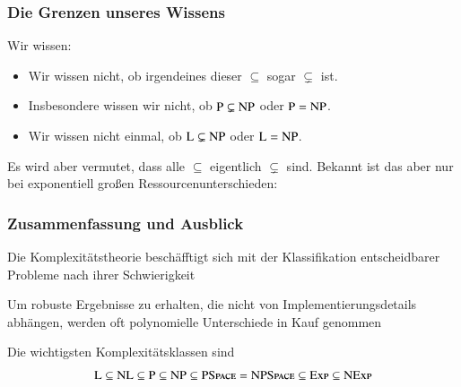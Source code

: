 \documentclass[onlymath]{beamer}
\begin{document}
\begin{frame}\frametitle{Die Grenzen unseres Wissens}

Wir wissen:

\theobox{
\[\Scomplclass{L}\subseteq\Scomplclass{NL}\subseteq \Scomplclass{P}\subseteq\Scomplclass{NP}\subseteq\Scomplclass{PSpace}= \Scomplclass{NPSpace}\subseteq \Scomplclass{Exp}\subseteq \Scomplclass{NExp}\]
\vspace{-2.5ex}
}

\begin{itemize}
\item Wir wissen nicht, ob irgendeines dieser $\subseteq$ sogar $\subsetneq$ ist.
\item Insbesondere wissen wir nicht, ob ${\textsc{P}}\subsetneq{\textsc{NP}}$ oder ${\textsc{P}}={\textsc{NP}}$.
\item Wir wissen nicht einmal, ob ${\textsc{L}}\subsetneq{\textsc{NP}}$ oder ${\textsc{L}}={\textsc{NP}}$.
\end{itemize}\pause
Es wird aber vermutet, dass alle  $\subseteq$ eigentlich $\subsetneq$ sind.
% 
Bekannt ist das aber nur bei exponentiell großen Ressourcenunterschieden:


\end{frame}



\begin{frame}\frametitle{Zusammenfassung und Ausblick}

Die Komplexitätstheorie beschäfftigt sich mit der Klassifikation 
entscheidbarer Probleme nach ihrer Schwierigkeit\bigskip

Um robuste Ergebnisse zu erhalten, die nicht von Implementierungsdetails
abhängen, werden oft polynomielle Unterschiede in Kauf genommen\bigskip

Die wichtigsten Komplexitätsklassen sind
\[\Scomplclass{L}\subseteq\Scomplclass{NL}\subseteq \Scomplclass{P}\subseteq\Scomplclass{NP}\subseteq\Scomplclass{PSpace}= \Scomplclass{NPSpace}\subseteq \Scomplclass{Exp}\subseteq \Scomplclass{NExp}\]


\end{frame}
\end{document}
